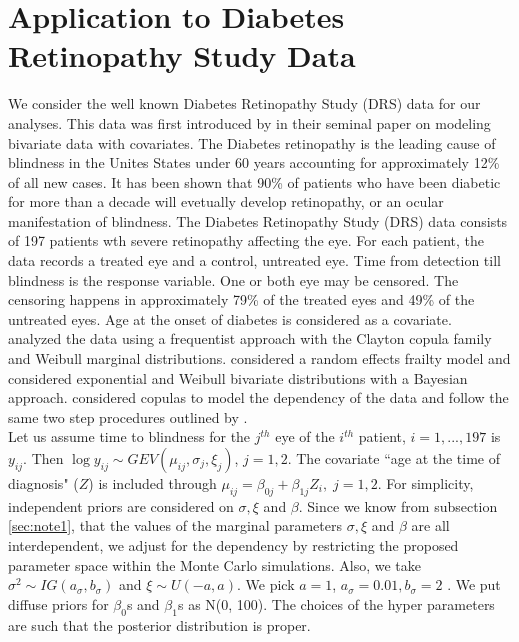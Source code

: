 \documentclass[11pt]{article}
\theoremstyle{remboldstyle}
\begin{document}
\section{Application to Diabetes Retinopathy Study Data}
\label{sec:drs}
\noindent
We consider the well known Diabetes Retinopathy Study (DRS) data for our analyses. This data was first introduced by \cite{huster:brookmeyer:self:1989} in their seminal paper on modeling bivariate data with covariates. The Diabetes retinopathy is the leading cause of blindness in the Unites States under 60 years accounting for approximately 12\% of all new cases. 
It has been shown that 90\% of patients who have been diabetic for more than a decade will evetually develop retinopathy, or an ocular manifestation of blindness. The Diabetes Retinopathy Study (DRS) data consists of 197 patients wth severe retinopathy affecting the eye. For each patient, the data records a treated eye and a control, untreated eye. Time from detection till blindness is the response variable. One or both eye may be censored. The censoring happens in approximately 79\% of the treated eyes and 49\% of the untreated eyes. Age at the onset of diabetes is considered as a covariate.\\ 
\noindent
\cite{huster:brookmeyer:self:1989} analyzed the data using a frequentist approach with the Clayton copula family and Weibull marginal distributions. \cite{th:gram:2000} considered a random effects frailty model and \cite{sahu:dey:2000} considered exponential and Weibull bivariate distributions with a Bayesian approach. \cite{romeo:tanaka:2006} considered copulas to model the dependency of the data and follow the same two step procedures outlined by \cite{shih:louis:1995}. \\
Let us assume time to blindness for the $j^{th}$ eye of the $i^{th}$ patient, $i = 1,...,197$ is $y_{ij}$. Then $\log y_{ij} \sim GEV(\mu_{ij}, \sigma_j, \xi_j)$, $j = 1,2$. The covariate ``age at the time of diagnosis" ($Z$) is included through $\mu_{ij} = \beta_{0j} + \beta_{1j}Z_i,\; j = 1,2$. For simplicity, independent priors are considered on $\sigma, \xi$ and $\beta$. Since we know from subsection \ref{sec:note1}, that the values of the marginal parameters  $\sigma, \xi$ and $\beta$ are all interdependent, we adjust for the dependency by restricting the proposed parameter space within the Monte Carlo simulations. Also, we take $\sigma^2 \sim IG(a_{\sigma}, b_{\sigma})$ and $\xi \sim U(-a, a)$. We pick $a = 1$, $a_{\sigma} = 0.01, b_{\sigma} = 2$ . We put diffuse priors for $\beta_0$s and $\beta_1$s as N(0, 100). The choices of the hyper parameters are such that the posterior distribution is proper.\\
\end{document}
